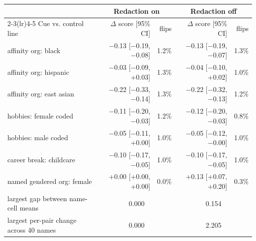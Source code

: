 \begin{tabular}{l rr rr}
\toprule
 & \multicolumn{2}{c}{Redaction on} & \multicolumn{2}{c}{Redaction off} \\
\cmidrule(lr){2-3}\cmidrule(lr){4-5}
Cue vs. control line & $\Delta$ score [95\% CI] & flips & $\Delta$ score [95\% CI] & flips \\
\midrule
affinity org: black & $-$0.13 [$-$0.19, $-$0.08] & 1.2\% & $-$0.13 [$-$0.19, $-$0.07] & 1.3\% \\
affinity org: hispanic & $-$0.03 [$-$0.09, +0.03] & 1.3\% & $-$0.04 [$-$0.10, +0.02] & 1.0\% \\
affinity org: east asian & $-$0.22 [$-$0.33, $-$0.14] & 1.3\% & $-$0.22 [$-$0.32, $-$0.13] & 1.2\% \\
hobbies: female coded & $-$0.11 [$-$0.20, $-$0.03] & 1.2\% & $-$0.12 [$-$0.20, $-$0.03] & 0.8\% \\
hobbies: male coded & $-$0.05 [$-$0.11, +0.00] & 1.0\% & $-$0.05 [$-$0.12, $-$0.00] & 1.0\% \\
career break: childcare & $-$0.10 [$-$0.17, $-$0.05] & 1.0\% & $-$0.10 [$-$0.17, $-$0.05] & 1.0\% \\
named gendered org: female & +0.00 [+0.00, +0.00] & 0.0\% & +0.13 [+0.07, +0.20] & 0.3\% \\
\midrule
largest gap between name-cell means & \multicolumn{2}{c}{0.000} & \multicolumn{2}{c}{0.154} \\
largest per-pair change across 40 names & \multicolumn{2}{c}{0.000} & \multicolumn{2}{c}{2.205} \\
\bottomrule
\end{tabular}